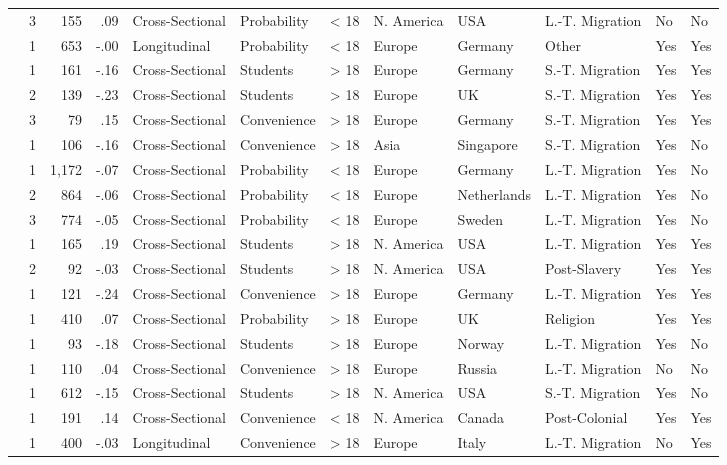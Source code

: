 \documentclass[10pt, letterpaper]{article}
\begin{document}
\begin{landscape}
\begin{xltabular}{650pt}{Xrrrllrlllll}
 & 3 & 155 & .09 & Cross-Sectional & Probability & < 18 & N. America & USA & L.-T. Migration & No & No\\
\cite{401} & 1 & 653 & -.00 & Longitudinal & Probability & < 18 & Europe & Germany & Other & Yes & Yes\\
\cite{45} & 1 & 161 & -.16 & Cross-Sectional & Students & > 18 & Europe & Germany & S.-T. Migration & Yes & Yes\\
 & 2 & 139 & -.23 & Cross-Sectional & Students & > 18 & Europe & UK & S.-T. Migration & Yes & Yes\\
 & 3 & 79 & .15 & Cross-Sectional & Convenience & > 18 & Europe & Germany & S.-T. Migration & Yes & Yes\\
\cite{1993} & 1 & 106 & -.16 & Cross-Sectional & Convenience & > 18 & Asia & Singapore & S.-T. Migration & Yes & No\\
\cite{3134} & 1 & 1,172 & -.07 & Cross-Sectional & Probability & < 18 & Europe & Germany & L.-T. Migration & Yes & No\\
 & 2 & 864 & -.06 & Cross-Sectional & Probability & < 18 & Europe & Netherlands & L.-T. Migration & Yes & No\\
 & 3 & 774 & -.05 & Cross-Sectional & Probability & < 18 & Europe & Sweden & L.-T. Migration & Yes & No\\
\cite{1042} & 1 & 165 & .19 & Cross-Sectional & Students & > 18 & N. America & USA & L.-T. Migration & Yes & Yes\\
 & 2 & 92 & -.03 & Cross-Sectional & Students & > 18 & N. America & USA & Post-Slavery & Yes & Yes\\
\cite{4000} & 1 & 121 & -.24 & Cross-Sectional & Convenience & > 18 & Europe & Germany & L.-T. Migration & Yes & Yes\\
\cite{893} & 1 & 410 & .07 & Cross-Sectional & Probability & > 18 & Europe & UK & Religion & Yes & Yes\\
\cite{3005} & 1 & 93 & -.18 & Cross-Sectional & Students & > 18 & Europe & Norway & L.-T. Migration & Yes & No\\
\cite{1850} & 1 & 110 & .04 & Cross-Sectional & Convenience & > 18 & Europe & Russia & L.-T. Migration & No & No\\
\cite{823} & 1 & 612 & -.15 & Cross-Sectional & Students & > 18 & N. America & USA & S.-T. Migration & Yes & No\\
\cite{1762} & 1 & 191 & .14 & Cross-Sectional & Convenience & < 18 & N. America & Canada & Post-Colonial & Yes & Yes\\
\cite{2391} & 1 & 400 & -.03 & Longitudinal & Convenience & > 18 & Europe & Italy & L.-T. Migration & No & Yes\\

\end{xltabular}
\end{landscape}
\end{document}
